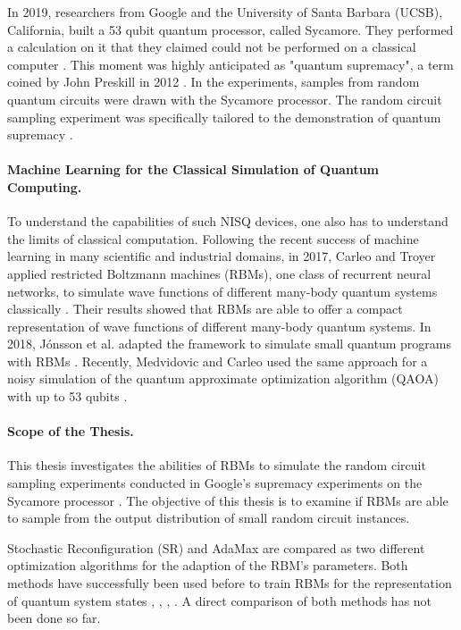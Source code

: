 In 2019, researchers from Google and the University of Santa Barbara (UCSB), California, built a 
53 qubit quantum processor, called Sycamore. They performed a calculation on it that they claimed could not be 
performed on a classical computer \cite{martines2019supremacy}. This moment was highly anticipated 
as "quantum supremacy", a term coined by John Preskill in 2012 \cite{preskill2012quantum}. In the experiments, 
samples from random quantum circuits were drawn with the Sycamore processor.
The random circuit sampling experiment was specifically tailored 
to the demonstration of quantum supremacy \cite{Boixo2018supremacy}.

\paragraph{Machine Learning for the Classical Simulation of Quantum Computing.}
To understand the capabilities of such NISQ devices, one also has to understand 
the limits of classical computation. Following the recent success of machine learning in 
many scientific and industrial domains, in 2017, Carleo and Troyer applied restricted Boltzmann machines (RBMs),
one class of recurrent neural networks,
to simulate wave functions of different many-body quantum systems classically \cite{carleo2017solving}.
Their results showed that RBMs are able to offer a compact representation of wave functions 
of different many-body quantum systems. In 2018, 
J\'{o}nsson et al. adapted the framework to simulate small quantum programs with 
RBMs \cite{jnsson2018neuralnetwork}. Recently, Medvidovic and Carleo used the 
same approach for a noisy simulation of the quantum approximate optimization algorithm 
(QAOA) with up to 53 qubits \cite{medvidovic2020classical}.

\paragraph{Scope of the Thesis.}
This thesis investigates the abilities of RBMs to simulate the random circuit sampling 
experiments conducted in Google's supremacy experiments on the Sycamore processor \cite{martines2019supremacy}. 
The objective of this thesis is to examine if RBMs are able to sample from the output distribution 
of small random circuit instances.

Stochastic Reconfiguration (SR) \cite{sorella1998green} and 
AdaMax \cite{kingma2014adam} are compared as two different optimization algorithms for the 
adaption of the RBM's parameters. Both methods have successfully been used before to train RBMs 
for the representation of quantum system states \cite{jnsson2018neuralnetwork}, \cite{carleo2017solving}, \cite{carleo2018constructing}, \cite{medvidovic2020classical}.
A direct comparison of both methods has not been done so far. 

